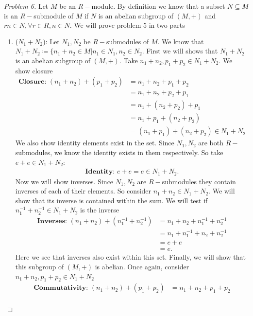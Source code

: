 \documentclass[titlepage]{article}
\theoremstyle{plain}
\theoremstyle{definition}
\theoremstyle{remark}
\theoremstyle{exercise-style}
\numberwithin{equation}{section}
\numberwithin{theorem}{section}
\numberwithin{remark}{section}
\begin{document}
\begin{proof}[Problem 6]
    Let $M$ be an $R-$module. By definition we know that a subset $N \subseteq M$ is an $R-$submodule of $M$ if $N$ is an abelian subgroup of $(M, +)$ and $rn \in N, \forall r \in R, n \in N$. We will prove problem 5 in two parts
    \begin{enumerate}
        \item ($N_1 + N_2$): Let $N_1, N_2$ be $R-$submodules of $M$. We know that $N_1 + N_2 \coloneq \{ n_1 + n_2 \in M | n_1 \in N_1, n_2 \in N_2$. First we will shows that $N_1 +N_2$ is an abelian subgroup of $(M, +)$. Take $n_1 + n_2, p_1 +p_2 \in N_1 + N_2$. We show closure
        \begin{align}
            \textbf{Closure: }(n_1 + n_2) + (p_1 + p_2) &= n_1 + n_2 + p_1 + p_2 \\
            &= n_1 + n_2 + p_2 + p_1 \\
            &= n_1 + (n_2 + p_2) + p_1 \\
            &= n_1 + p_1 + (n_2 + p_2) \\
            &= (n_1 + p_1) + (n_2 + p_2) \in N_1 + N_2
        \end{align}
        We also show identity elements exist in the set. Since $N_1, N_2$ are both $R-$submodules, we know the identity exists in them respectively. So take $e + e \in N_1 + N_2$:
        \begin{align}
            \textbf{Identity: } e + e = e \in N_1 + N_2.
        \end{align}
        Now we will show inverses. Since $N_1, N_2$ are $R-$submodules they contain inverses of each of their elements. So consider $n_1+n_2 \in N_1 + N_2$. We will show that its inverse is contained within the sum. We will test if $n_1^{-1} +n_2^{-1} \in N_1 + N_2$ is the inverse
        \begin{align}
            \textbf{Inverses: } (n_1 +n_2) + (n_1^{-1} + n_2^{-1}) &= n_1 +n_2 + n_1^{-1} + n_2^{-1} \\
            &= n_1 + n_1^{-1} + n_2 + n_2^{-1} \\
            &= e + e \\
            &= e.
        \end{align}
        Here we see that inverses also exist within this set. Finally, we will show that this subgroup of $(M,+)$ is abelian. Once again, consider $n_1 + n_2, p_1 + p_2 \in N_1 + N_2$
        \begin{align}
            \textbf{Commutativity: }(n_1 + n_2) + (p_1 + p_2) &= n_1 + n_2 + p_1 + p_2 \\

\end{align}
\end{enumerate}
\end{proof}
\end{document}
